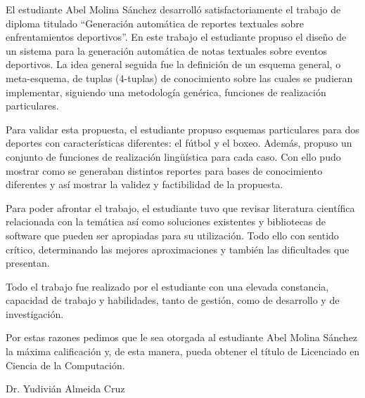 \begin{opinion}
    
    El estudiante Abel Molina Sánchez desarrolló satisfactoriamente el trabajo de diploma 
titulado “Generación automática de reportes textuales sobre enfrentamientos deportivos”. En este 
trabajo el estudiante propuso el diseño de un sistema para la generación automática de notas 
textuales sobre eventos deportivos. La idea general seguida fue la definición de un esquema general, 
o meta-esquema, de tuplas (4-tuplas) de conocimiento sobre las cuales se pudieran implementar, 
siguiendo una metodología genérica, funciones de realización particulares. 
    
    Para validar esta propuesta, el estudiante propuso esquemas particulares para dos deportes con 
características diferentes: el fútbol y el boxeo. Además, propuso un conjunto de funciones de 
realización lingüística para cada caso. Con ello pudo mostrar como se generaban distintos reportes 
para bases de conocimiento diferentes y así mostrar la validez y factibilidad de la propuesta.
    
    Para poder afrontar el trabajo, el estudiante tuvo que revisar literatura científica relacionada 
con la temática así como soluciones existentes y bibliotecas de software que pueden ser apropiadas 
para su utilización. Todo ello con sentido crítico, determinando las mejores aproximaciones y también 
las dificultades que presentan.
    
    Todo el trabajo fue realizado por el estudiante con una elevada constancia, capacidad de trabajo y 
habilidades, tanto de gestión, como de desarrollo y de investigación. 
    
    Por estas razones pedimos que le sea otorgada al estudiante Abel Molina Sánchez la máxima calificación 
y, de esta manera, pueda obtener el título de Licenciado en Ciencia de la Computación.
    
    
Dr. Yudivián Almeida Cruz

\end{opinion}